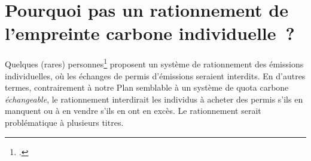 \documentclass[a5paper,french]{memoir}
\begin{document}
\section*{\normalsize Pourquoi pas un rationnement de l'empreinte carbone individuelle~?}\label{q:rationnement}

Quelques (rares) personnes\footnote{\cite{wood_rationing_2023}.} proposent un système de rationnement des émissions individuelles, où les échanges de permis d'émissions seraient interdits. En d'autres termes, contrairement à notre Plan semblable à un système de quota carbone \textit{échangeable}, le rationnement interdirait les individus à acheter des permis s'ils en manquent ou à en vendre s'ils en ont en excès. %
Le rationnement serait problématique à plusieurs titres. 
\end{document}
